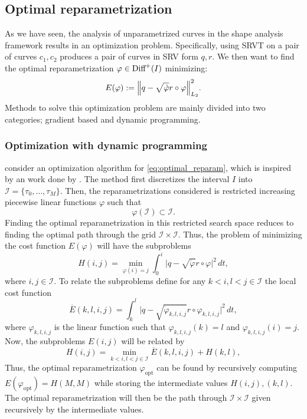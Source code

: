 
\subsection{Optimal reparametrization}
As we have seen, the analysis of unparametrized curves in the shape analysis framework results in an optimization problem. Specifically, using SRVT on a pair of curves \(c_1, c_2\) produces a pair of curves in SRV form \(q, r\). We then want to find the optimal reparametrization \(\varphi \in \text{Diff}^+(I)\) minimizing: 
\begin{equation}\label{eq:optimal_reparam}
  E(\varphi):=\norm{q- \sqrt{\dot\varphi}r \circ \varphi}_{L_2}^2.
\end{equation}
Methods to solve this optimization problem are mainly divided into two categories; gradient based and dynamic programming. 

\subsubsection{Optimization with dynamic programming}
\citeauthor{bauer2017dp} \cite{bauer2017dp} consider an optimization algorithm for \eqref{eq:optimal_reparam}, which is inspired by an work done by \citeauthor{kima2003_dp} \cite{kima2003_dp}. The method first discretizes the interval \(I\) into  \(\mathcal{I} = \{\tau_0, \ldots, \tau_M\}\). Then, the reparametrizations considered is restricted increasing piecewise linear functions \(\varphi\) such that
\begin{equation*}
 \varphi(\mathcal{I}) \subset \mathcal{I}. 
\end{equation*}
Finding the optimal reparametrization in this restricted search space reduces to finding the optimal path through the grid \(\mathcal{I}\times\mathcal{I}\). Thus, the problem of minimizing the cost function \(E(\varphi)\) will have the subproblems 
\begin{equation*}
  H(i, j) = \min_{\varphi(i) = j} \int_0^i \vert q- \sqrt{\dot\varphi }r \circ \varphi \vert^2 \, dt,
\end{equation*}
where \(i,j \in \mathcal{I}\). To relate the subproblems define for any \(k <i, l<j \in \mathcal{I} \) the local cost function 
\begin{equation*}
  \overline E(k,l,i,j) =   \int_k^l \vert q- \sqrt{\dot\varphi_{k,l,i,j} }r \circ \varphi_{k,l,i,j} \vert^2 \, dt ,
\end{equation*}
where \(\varphi_{k,l,i,j} \) is the linear function such that \(\varphi_{k,l,i,j}(k)=l\) and \(\varphi_{k,l,i,j}(i)=j\). Now, the subproblems \(E(i,j)\) will be related by 
\begin{equation*}
  H(i,j)  = \min_{k<i,l<j\in \mathcal{I}}\overline{E}(k,l,i,j) + H(k,l), 
\end{equation*}
Thus, the optimal reparametrization \(\varphi_\text{opt}\) can be found by recursively computing \(E(\varphi_\text{opt})= H(M,M)\) while storing the intermediate values \(H(i,j), (k,l)\). The optimal reparametrization will then be the path through \(\mathcal{I}\times\mathcal{I}\) given recursively by the intermediate values. 

